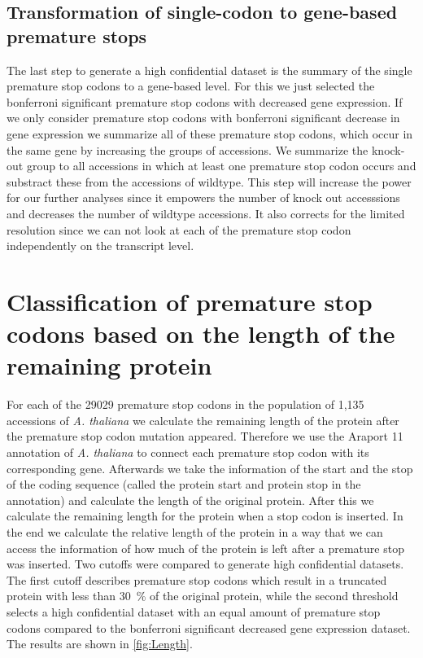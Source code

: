 \subsection*{Transformation of single-codon to gene-based premature stops}
The last step to generate a high confidential dataset is the summary of the single premature stop codons to a gene-based level. For this we just selected the bonferroni significant premature stop codons with decreased gene expression. If we only consider premature stop codons with bonferroni significant decrease in gene expression we summarize all of these premature stop codons, which occur in the same gene by increasing the groups of accessions. We summarize the knock-out group to all accessions in which at least one premature stop codon occurs and substract these from the accessions of wildtype. This step will increase the power for our further analyses since it empowers the number of knock out accesssions and decreases  the number of wildtype accessions. It also corrects for the limited resolution since we can not look at each of the premature stop codon independently on the transcript level. 

\section{Classification of premature stop codons based on the length of the remaining protein} 
For each of the 29029 premature stop codons in the population of 1,135 accessions of \textit{A. thaliana} we calculate the remaining length of the protein after the premature stop codon mutation appeared. Therefore we use the Araport 11 annotation of \textit{A. thaliana} to connect each premature stop codon with its corresponding gene. Afterwards we take the information of the start and the stop of the coding sequence (called the protein start and protein stop in the annotation) and calculate the length of the original protein. After this we calculate the remaining length for the protein when a stop codon is inserted. In the end we calculate the relative length of the protein in a way that we can access the information of how much of the protein is left after a premature stop was inserted. Two cutoffs were compared to generate high confidential datasets. The first cutoff describes premature stop codons which result in a truncated protein with less than \SI{30}{\percent} of the original protein, while the second threshold selects a high confidential dataset with an equal amount of premature stop codons compared to the bonferroni significant decreased gene expression dataset. The results are shown in \autoref{fig:Length}. 
